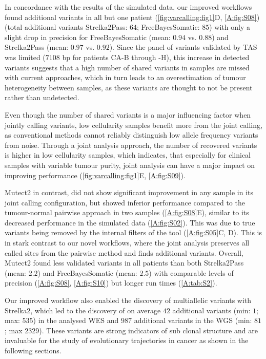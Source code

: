In concordance with the results of the simulated data, our improved workflows found additional variants in all but one patient (\autoref{fig:varcalling:fig1}D, \autoref{A:fig:S08}) (total additional variants Strelka2Pass: $64$; FreeBayesSomatic: $85$) with only a slight drop in precision for FreeBayesSomatic (mean: $0.94$ vs. $0.88$) and Strelka2Pass (mean: $0.97$ vs. $0.92$). Since the panel of variants validated by TAS was limited ($7108$ bp for patients CA-B through -H), this increase in detected variants suggests that a high number of shared variants in samples are missed with current approaches, which in turn leads to an overestimation of tumour heterogeneity between samples, as these variants are thought to not be present rather than undetected.

Even though the number of shared variants is a major influencing factor when jointly calling variants, low cellularity samples benefit more from the joint calling, as conventional methods cannot reliably distinguish low allele frequency variants from noise. Through a joint analysis approach, the number of recovered variants is higher in low cellularity samples, which indicates, that especially for clinical samples with variable tumour purity, joint analysis can have a major impact on improving performance (\autoref{fig:varcalling:fig1}E, \autoref{A:fig:S09}).

Mutect2 in contrast, did not show significant improvement in any sample in its joint calling configuration, but showed inferior performance compared to the tumour-normal pairwise approach in two samples (\autoref{A:fig:S08}E), similar to its decreased performance in the simulated data (\autoref{A:fig:S02}). This was due to true variants being removed by the internal filters of the tool (\autoref{A:fig:S05}C, D). This is in stark contrast to our novel workflows, where the joint analysis preserves all called sites from the pairwise method and finds additional variants. Overall, Mutect2 found less validated variants in all patients than both Strelka2Pass (mean: $2.2$) and FreeBayesSomatic (mean: $2.5$) with comparable levels of precision (\autoref{A:fig:S08}, \autoref{A:fig:S10}) but longer run times (\autoref{A:tab:S2}).

Our improved workflow also enabled the discovery of multiallelic variants with Strelka2, which led to the discovery of on average $42$ additional variants (min: $1$; max: $535$) in the analysed WES and $987$ additional variants in the WGS (min: $81$; max $2329$). These variants are strong indicators of sub clonal structure and are invaluable for the study of evolutionary trajectories in cancer as shown in the following sections.


